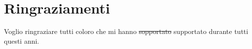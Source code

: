 \rhead[\fancyplain{}{\bfseries \leftmark}]{\fancyplain{}{\bfseries
\thepage}}

\clearpage{\pagestyle{empty}\cleardoublepage}
\chapter*{Ringraziamenti}
\thispagestyle{empty}



Voglio ringraziare tutti coloro che mi hanno \sout{sopportato} supportato durante tutti questi anni.